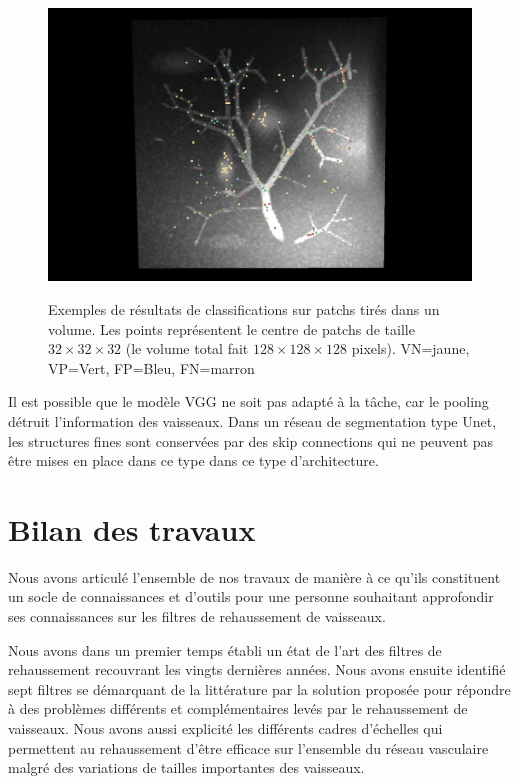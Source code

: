 \begin{figure}[ht]
    \centering
    \includegraphics[height=8cm]{Images/exp_bifurcations.png}
    \caption{Exemples de résultats de classifications sur patchs tirés dans un volume. Les points représentent le centre de patchs de taille $32 \times 32 \times 32$ (le volume total fait $128 \times 128 \times 128$ pixels). VN=jaune, VP=Vert, FP=Bleu, FN=marron}
    \label{fig:exp_patchs}
\end{figure}

Il est possible que le modèle VGG ne soit pas adapté à la tâche, car le pooling détruit l'information des vaisseaux. Dans un réseau de segmentation type Unet, les structures fines sont conservées par des skip connections qui ne peuvent pas être mises en place dans ce type dans ce type d'architecture.

\section{ Bilan des travaux}


Nous avons articulé l'ensemble de nos travaux de manière à ce qu'ils constituent un socle de connaissances et d'outils pour une personne souhaitant approfondir ses connaissances sur les filtres de rehaussement de vaisseaux. 

Nous avons dans un premier temps établi un état de l'art des filtres de rehaussement recouvrant les vingts dernières années. Nous avons ensuite identifié sept filtres se démarquant de la littérature par la solution proposée pour répondre à des problèmes différents et complémentaires levés par le rehaussement de vaisseaux. Nous avons aussi explicité les différents cadres d'échelles qui permettent au rehaussement d'être efficace sur l'ensemble du réseau vasculaire malgré des variations de tailles importantes des vaisseaux.


